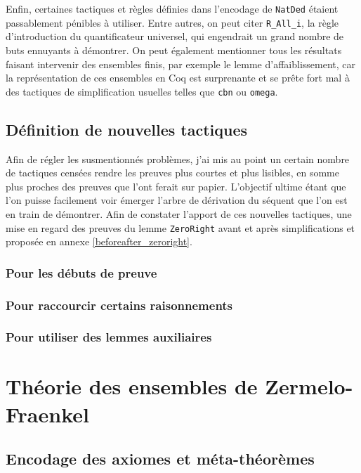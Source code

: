 \documentclass[a4paper]{article}
\theoremstyle{remark}
\theoremstyle{remark}
\theoremstyle{remark}
\theoremstyle{definition}
\theoremstyle{definition}
\theoremstyle{definition}
\begin{document}
Enfin, certaines tactiques et règles définies dans l'encodage de \verb+NatDed+ étaient passablement pénibles à utiliser. Entre autres, on peut citer \verb+R_All_i+, la règle d'introduction du quantificateur universel, qui engendrait un grand nombre de buts ennuyants à démontrer. On peut également mentionner tous les résultats faisant intervenir des ensembles finis, par exemple le lemme d'affaiblissement, car la représentation de ces ensembles en Coq est surprenante et se prête fort mal à des tactiques de simplification usuelles telles que \verb+cbn+ ou \verb+omega+.

\subsection{Définition de nouvelles tactiques}\label{sol}

Afin de régler les susmentionnés problèmes, j'ai mis au point un certain nombre de tactiques censées rendre les preuves plus courtes et plus lisibles, en somme plus proches des preuves que l'ont ferait sur papier. L'objectif ultime étant que l'on puisse facilement voir émerger l'arbre de dérivation du séquent que l'on est en train de démontrer. Afin de constater l'apport de ces nouvelles tactiques, une mise en regard des preuves du lemme \verb+ZeroRight+ avant et après simplifications et proposée en annexe \ref{beforeafter_zeroright}.

\subsubsection{Pour les débuts de preuve}


\subsubsection{Pour raccourcir certains raisonnements}

\subsubsection{Pour utiliser des lemmes auxiliaires}


\section{Théorie des ensembles de {\sc Zermelo-Fraenkel}}

\subsection{Encodage des axiomes et méta-théorèmes}
\end{document}
